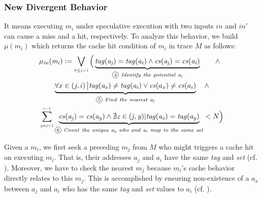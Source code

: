 \documentclass[sigconf]{acmart}
\newcommand*\circled[1]{\tikz[baseline=(char.base)]{
				\node[shape=circle,draw,inner sep=1pt] (char) {\scriptsize{#1}};}}
\begin{document}
\subsubsection{New Divergent Behavior}
\label{sec:new_div}
It means executing $\mathit{m_i}$ under speculative execution with two inputs 
$\mathit{in}$ and $\mathit{in'}$ can cause a miss and a hit, respectively. To
analyze this behavior, we build $\mathit{\mu(m_i)}$ which returns the cache hit
condition of $\mathit{m_i}$ in trace $\mathit{M}$ as follows:
%
%
\begin{multline}
  \label{eqn:hc}
    \mathit{\mu_{in}(m_i)}:=
    \bigvee_{{\scriptscriptstyle 0{\leq}j<i}}
    \Big(
    \underbrace{
      \mathit{tag(a_j)}=\mathit{tag(a_i)} 
			\wedge 
      \mathit{cs(a_j)}=\mathit{cs(a_i)} 
    }_{{\circled{4}}\mathit{~Identify~the~potential~a_j}}
    ~~~~~~\wedge 
		~~\\
    \underbrace{
      {\forall}x\in\left(j,i\right)\big |\mathit{tag(a_x)}\ne\mathit{tag(a_i)}
      \vee 
      \mathit{cs}(a_x)\ne\mathit{cs}(a_i)
    }_{{\circled{5}}\mathit{~Find~the~nearest~a_j}}
		~~~\wedge 
		\\
    \sum_{{\scriptscriptstyle \mathit{y=j}+1}}^{{\scriptscriptstyle \mathit{i-}1}} 
    \underbrace{
      \mathit{cs(a_j)}=\mathit{cs(a_y)} 
      \wedge
      \nexists\mathit{z}\in(\mathit{j,y})|\mathit{tag(a_z)}=\mathit{tag(a_y)}
    }_{{\circled{6}}\mathit{~Count~the~unique~a_y~who~and~a_i~map~to~the~same~set}}
    <N 
    \Big)
\end{multline}
\vspace{.8ex}
%
%

Given a $\mathit{m_i}$, we first seek a preceding $\mathit{m_j}$ from 
$\mathit{M}$ who might triggers a cache hit on executing $\mathit{m_i}$. 
That is, their addresses $\mathit{a_j}$ and $\mathit{a_i}$ have the same 
\emph{tag} and \emph{set} (cf. \circled{4}). Moreover, we have to check 
the nearest $\mathit{m_j}$ because $\mathit{m_i}$'s cache behavior directly 
relates to this $\mathit{m_j}$. This is accomplished by ensuring non-existence 
of a $\mathit{a_x}$ between $\mathit{a_j}$ and $\mathit{a_i}$ who has the same 
\textit{tag} and \textit{set} values to $\mathit{a_i}$ (cf. \circled{5}).
\end{document}
